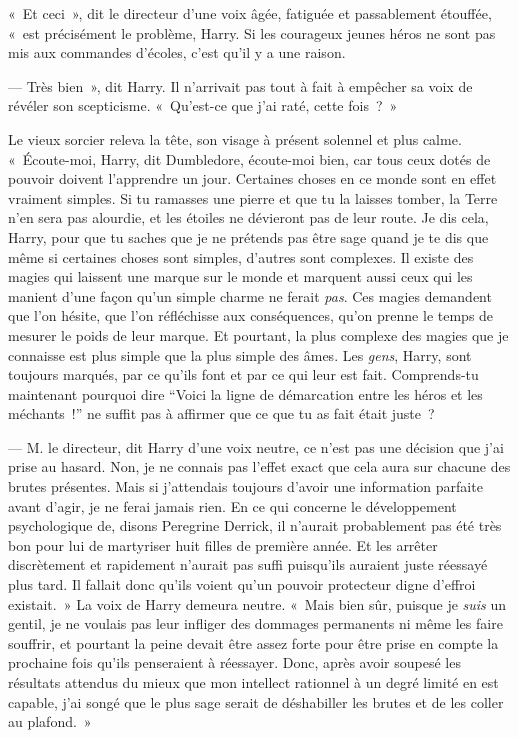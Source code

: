 «~Et ceci~», dit le directeur d'une voix âgée, fatiguée et passablement étouffée, «~est précisément le problème, Harry.
Si les courageux jeunes héros ne sont pas mis aux commandes d'écoles, c'est qu'il y a une raison.

--- Très bien~», dit Harry.
Il n'arrivait pas tout à fait à empêcher sa voix de révéler son scepticisme.
«~Qu'est-ce que j'ai raté, cette fois~?~»

Le vieux sorcier releva la tête, son visage à présent solennel et plus calme.
«~Écoute-moi, Harry, dit Dumbledore, écoute-moi bien, car tous ceux dotés de pouvoir doivent l'apprendre un jour.
Certaines choses en ce monde sont en effet vraiment simples.
Si tu ramasses une pierre et que tu la laisses tomber, la Terre n'en sera pas alourdie, et les étoiles ne dévieront pas de leur route.
Je dis cela, Harry, pour que tu saches que je ne prétends pas être sage quand je te dis que même si certaines choses sont simples, d'autres sont complexes.
Il existe des magies qui laissent une marque sur le monde et marquent aussi ceux qui les manient d'une façon qu'un simple charme ne ferait \emph{pas}.
Ces magies demandent que l'on hésite, que l'on réfléchisse aux conséquences, qu'on prenne le temps de mesurer le poids de leur marque.
Et pourtant, la plus complexe des magies que je connaisse est plus simple que la plus simple des âmes.
Les \emph{gens}, Harry, sont toujours marqués, par ce qu'ils font et par ce qui leur est fait.
Comprends-tu maintenant pourquoi dire “Voici la ligne de démarcation entre les héros et les méchants~!” ne suffit pas à affirmer que ce que tu as fait était juste~?

--- M. le directeur, dit Harry d'une voix neutre, ce n'est pas une décision que j'ai prise au hasard.
Non, je ne connais pas l'effet exact que cela aura sur chacune des brutes présentes.
Mais si j'attendais toujours d'avoir une information parfaite avant d'agir, je ne ferai jamais rien.
En ce qui concerne le développement psychologique de, disons Peregrine Derrick, il n'aurait probablement pas été très bon pour lui de martyriser huit filles de première année.
Et les arrêter discrètement et rapidement n'aurait pas suffi puisqu'ils auraient juste réessayé plus tard.
Il fallait donc qu'ils voient qu'un pouvoir protecteur digne d'effroi existait.~»
La voix de Harry demeura neutre.
«~Mais bien sûr, puisque je \emph{suis} un gentil, je ne voulais pas leur infliger des dommages permanents ni même les faire souffrir, et pourtant la peine devait être assez forte pour être prise en compte la prochaine fois qu'ils penseraient à réessayer.
Donc, après avoir soupesé les résultats attendus du mieux que mon intellect rationnel à un degré limité en est capable, j'ai songé que le plus sage serait de déshabiller les brutes et de les coller au plafond.~»

